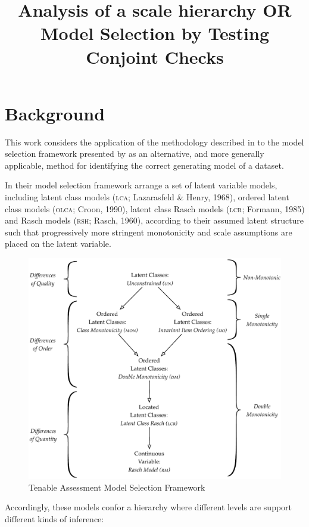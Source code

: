 \documentclass[12pt]{article}
\title{Analysis of a scale hierarchy OR Model Selection by Testing Conjoint Checks}
\date{}
\begin{document}
\maketitle
\onehalfspacing
\section{Background}
This work considers the application of the methodology described in  to the model selection framework presented by  as an alternative, and more generally applicable, method for identifying the correct generating model of a dataset.

In their model selection framework  arrange a set of latent variable models, including latent class models (\textsc{lca}; Lazarasfeld \& Henry, 1968), ordered latent class models (\textsc{olca}; Croon, 1990), latent class Rasch models (\textsc{lcr}; Formann, 1985) and Rasch models (\textsc{rsh}; Rasch, 1960), according to their assumed latent structure such that progressively more stringent monotonicity and scale assumptions are placed on the latent variable. 

\begin{figure}
\centering
\caption{Tenable Assessment Model Selection Framework} \label{orig}
\includegraphics[width=\textwidth]{./figs/TAmodelframework.pdf}
\end{figure}

Accordingly, these models confor a hierarchy where different levels are support different kinds of inference:
\end{document}
